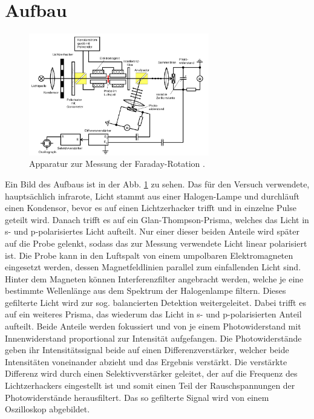 \section{Aufbau}
\label{sec:aufbau}



        \begin{figure}
            \includegraphics[width=0.7\textwidth]{aufbau.png}
            \centering
            \caption{Apparatur zur Messung der Faraday-Rotation \cite{alteanleitung}.}
            \label{fig:aufbau}
        \end{figure}

        Ein Bild des Aufbaus ist in der Abb. \ref{fig:aufbau} zu sehen. 
        Das für den Versuch verwendete, hauptsächlich infrarote, Licht 
        stammt aus einer Halogen-Lampe und durchläuft einen Kondensor,
        bevor es auf einen Lichtzerhacker trifft und in einzelne Pulse 
        geteilt wird. Danach trifft es auf ein Glan-Thompson-Prisma, 
        welches das Licht in s- und p-polarisiertes Licht aufteilt. 
        Nur einer dieser beiden Anteile wird später auf die Probe gelenkt,
        sodass das zur Messung verwendete Licht linear polarisiert ist.
        Die Probe kann in den Luftspalt von einem umpolbaren Elektromagneten
        eingesetzt werden, dessen Magnetfeldlinien parallel zum 
        einfallenden Licht sind. Hinter dem Magneten können Interferenzfilter 
        angebracht werden, welche je eine bestimmte Wellenlänge aus dem 
        Spektrum der Halogenlampe filtern. Dieses gefilterte Licht wird zur 
        sog. balancierten Detektion weitergeleitet. Dabei trifft es auf ein 
        weiteres Prisma, das wiederum das Licht in s- und p-polarisierten 
        Anteil aufteilt. Beide Anteile werden fokussiert und von je einem 
        Photowiderstand mit Innenwiderstand proportional zur Intensität aufgefangen.
        Die Photowiderstände geben ihr Intensitätssignal beide auf einen Differenzverstärker,
        welcher beide Intensitäten voneinander abzieht und das Ergebnis verstärkt.
        Die verstärkte Differenz wird durch einen Selektivverstärker geleitet, 
        der auf die Frequenz des Lichtzerhackers eingestellt ist und somit einen 
        Teil der Rauschspannungen der Photowiderstände herausfiltert. Das so gefilterte Signal
        wird von einem Oszilloskop abgebildet.
        

